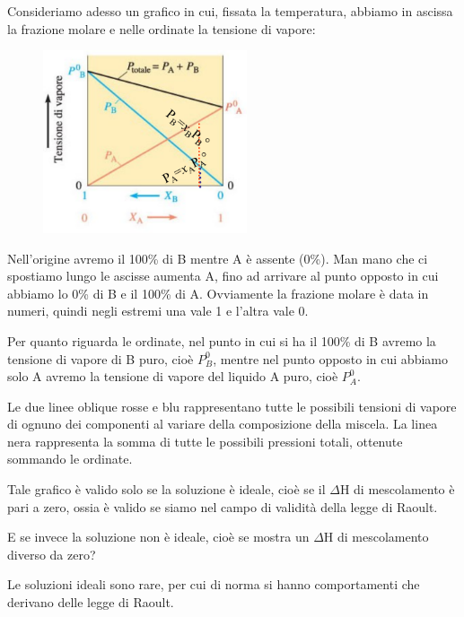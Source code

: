 Consideriamo adesso un grafico in cui, fissata la temperatura, abbiamo in ascissa la frazione molare e nelle ordinate la tensione di vapore:

\begin{minipage}{0.4\textwidth}
    \begin{figure}[H]
        \includegraphics[width=6cm]{immagini/tensione_di_vapore_sol_ideale.png}
    \end{figure}
\end{minipage}
\begin{minipage}{0.6\textwidth}
    Nell'origine avremo il 100\% di B mentre A è assente (0\%). Man mano che ci spostiamo lungo le ascisse aumenta A, fino ad arrivare al punto opposto in cui abbiamo lo 0\% di B e il 100\% di A. Ovviamente la frazione molare è data in numeri, quindi negli estremi una vale 1 e l'altra vale 0.

    Per quanto riguarda le ordinate, nel punto in cui si ha il 100\% di B avremo la tensione di vapore di B puro, cioè $P^0_B$, mentre nel punto opposto in cui abbiamo solo A avremo la tensione di vapore del liquido A puro, cioè $P^0_A$.
\end{minipage}

Le due linee oblique rosse e blu rappresentano tutte le possibili tensioni di vapore di ognuno dei componenti al variare della composizione della miscela. La linea nera rappresenta la somma di tutte le possibili pressioni totali, ottenute sommando le ordinate.

Tale grafico è valido solo se la soluzione è ideale, cioè se il $\Delta$H di mescolamento è pari a zero, ossia è valido se siamo nel campo di validità della legge di Raoult.

\vspace{0.2cm}E se invece la soluzione non è ideale, cioè se mostra un $\Delta$H di mescolamento diverso da zero?

Le soluzioni ideali sono rare, per cui di norma si hanno comportamenti che derivano delle legge di Raoult.

